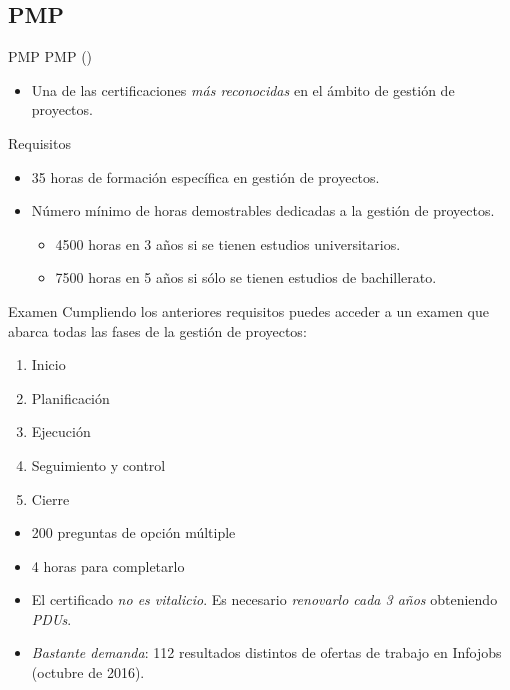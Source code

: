 \subsection{PMP}
\begin{frame}[allowframebreaks]{PMP}
	PMP ()
	\begin{itemize}
		\item Una de las certificaciones \emph{más reconocidas} en el ámbito de gestión de proyectos.
	\end{itemize}
	
	\begin{block}{Requisitos}
		\begin{itemize}
			\item 35 horas de formación específica en gestión de proyectos.
			\item Número mínimo de horas demostrables dedicadas a la gestión de proyectos.
			\begin{itemize}
				\item 4500 horas en 3 años si se tienen estudios universitarios.
				\item 7500 horas en 5 años si sólo se tienen estudios de bachillerato.
			\end{itemize}
		\end{itemize}
	\end{block}
	
	\begin{block}{Examen}
		Cumpliendo los anteriores requisitos puedes acceder a un examen que abarca todas las fases de la gestión de proyectos:
		\begin{enumerate}
			\item Inicio
			\item Planificación
			\item Ejecución
			\item Seguimiento y control
			\item Cierre
		\end{enumerate}
		\begin{itemize}
			\item 200 preguntas de opción múltiple
			\item 4 horas para completarlo
		\end{itemize}
	\end{block}
	
	\framebreak
	
	\begin{itemize}
		\item El certificado \emph{no es vitalicio}. Es necesario \emph{renovarlo cada 3 años} obteniendo \emph{PDUs}.
		
		\item \emph{Bastante demanda}: 112 resultados distintos de ofertas de trabajo en Infojobs (octubre de 2016).
	\end{itemize}
\end{frame}

